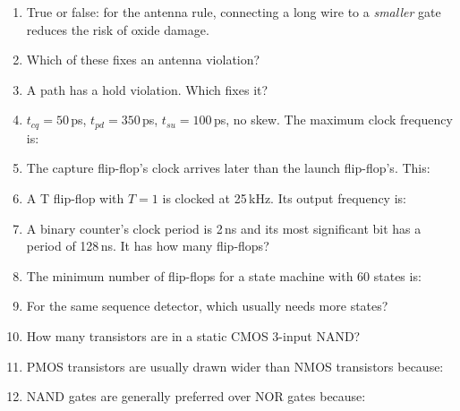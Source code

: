 \begin{enumerate}
  \item True or false: for the antenna rule, connecting a long wire to a \emph{smaller} gate reduces the risk of oxide damage.

  \item Which of these fixes an antenna violation?

  \item A path has a hold violation. Which fixes it?

  \item $t_{cq} = 50$\,ps, $t_{pd} = 350$\,ps, $t_{su} = 100$\,ps, no skew. The maximum clock frequency is:

  \item The capture flip-flop's clock arrives later than the launch flip-flop's. This:

  \item A T flip-flop with $T = 1$ is clocked at 25\,kHz. Its output frequency is:

  \item A binary counter's clock period is 2\,ns and its most significant bit has a period of 128\,ns. It has how many flip-flops?

  \item The minimum number of flip-flops for a state machine with 60 states is:

  \item For the same sequence detector, which usually needs more states?

  \item How many transistors are in a static CMOS 3-input NAND?

  \item PMOS transistors are usually drawn wider than NMOS transistors because:

  \item NAND gates are generally preferred over NOR gates because:


\end{enumerate}
